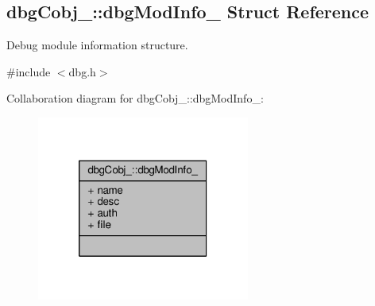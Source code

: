\hypertarget{structdbgCobj___1_1dbgModInfo__}{\subsection{dbg\-Cobj\-\_\-\-:\-:dbg\-Mod\-Info\-\_\- Struct Reference}
\label{structdbgCobj___1_1dbgModInfo__}
}


Debug module information structure.  




{\ttfamily \#include $<$dbg.\-h$>$}



Collaboration diagram for dbg\-Cobj\-\_\-\-:\-:dbg\-Mod\-Info\-\_\-\-:\nopagebreak
\begin{figure}[H]
\begin{center}
\leavevmode
\includegraphics[width=198pt]{structdbgCobj___1_1dbgModInfo____coll__graph}
\end{center}
\end{figure}
